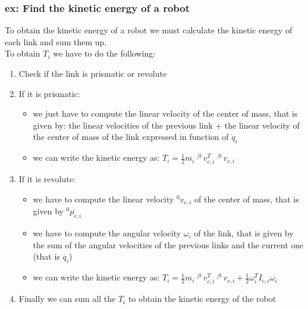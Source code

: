 \documentclass[a4paper,12pt]{article}
\begin{document}
\subsubsection{ex: Find the kinetic energy of a robot}
To obtain the kinetic energy of a robot we must calculate the kinetic 
energy of each link and sum them up.\\
To obtain $T_i$ we have to do the following:
\begin{enumerate}
    \item Check if the link is prismatic or revolute
    \item If it is prismatic: \begin{itemize}
        \item we just have to compute the linear velocity of the center of mass, that is 
        given by: the linear velocities of the previous link + the linear velocity of the
            center of mass of the link expressed in function of $\dot{q}_i$ 
        \item we can write the kinetic energy as: $T_i = \frac{1}{2} m_i \cdot^0v_{c,i}^T\cdot^0v_{c,i}$
    \end{itemize}
    \item If it is revolute: \begin{itemize}
        \item we have to compute the linear velocity $^0v_{c,i}$ of the center of mass, that is 
        given by $^0\dot{p_{c,i}}$
        \item we have to compute the angular velocity $\omega_i$  of the link, that 
        is given by the sum of the angular velocities of the previous 
        links and the current one (that is $\dot{q_i}$)
        \item we can write the kinetic energy as: $T_i = \frac{1}{2} m_i \cdot^0v_{c,i}^T\cdot^0v_{c,i} + \frac{1}{2} \omega_i^T I_{c,i} \omega_i$
    \end{itemize}
        \item Finally we can sum all the $T_i$ to obtain the kinetic energy of the robot
    \end{enumerate}
\end{document}
